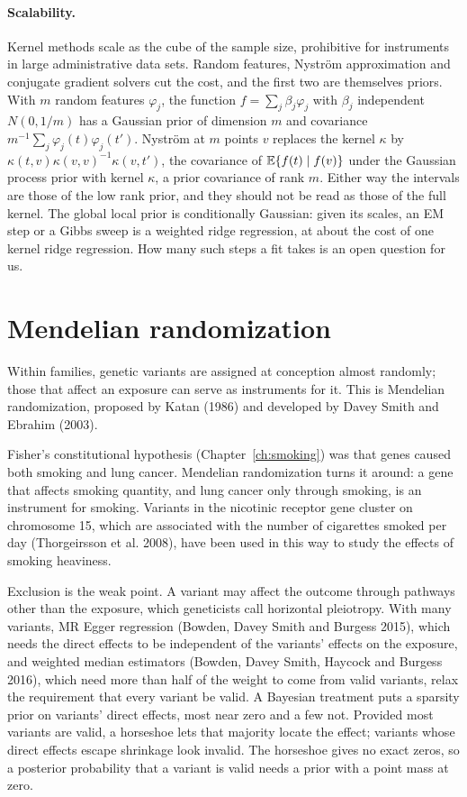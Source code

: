 \paragraph{Scalability.} Kernel methods scale as the cube of the sample size, prohibitive for instruments in large administrative data sets. Random features, Nystr\"om approximation and conjugate gradient solvers cut the cost, and the first two are themselves priors. With $m$ random features $\varphi_j$, the function $f = \sum_j \beta_j\varphi_j$ with $\beta_j$ independent $N(0, 1/m)$ has a Gaussian prior of dimension $m$ and covariance $m^{-1}\sum_j \varphi_j(t)\varphi_j(t')$. Nystr\"om at $m$ points $v$ replaces the kernel $\kappa$ by $\kappa(t, v)\kappa(v, v)^{-1}\kappa(v, t')$, the covariance of $\mathbb{E}\{f(t) \mid f(v)\}$ under the Gaussian process prior with kernel $\kappa$, a prior covariance of rank $m$. Either way the intervals are those of the low rank prior, and they should not be read as those of the full kernel. The global local prior is conditionally Gaussian: given its scales, an EM step or a Gibbs sweep is a weighted ridge regression, at about the cost of one kernel ridge regression. How many such steps a fit takes is an open question for us.

\section{Mendelian randomization}\label{iv:sec:mr}

Within families, genetic variants are assigned at conception almost randomly; those that affect an exposure can serve as instruments for it. This is Mendelian randomization, proposed by Katan (1986) and developed by Davey Smith and Ebrahim (2003).

Fisher's constitutional hypothesis (Chapter~\ref{ch:smoking}) was that genes caused both smoking and lung cancer. Mendelian randomization turns it around: a gene that affects smoking quantity, and lung cancer only through smoking, is an instrument for smoking. Variants in the nicotinic receptor gene cluster on chromosome 15, which are associated with the number of cigarettes smoked per day (Thorgeirsson et al. 2008), have been used in this way to study the effects of smoking heaviness.

Exclusion is the weak point. A variant may affect the outcome through pathways other than the exposure, which geneticists call horizontal pleiotropy. With many variants, MR Egger regression (Bowden, Davey Smith and Burgess 2015), which needs the direct effects to be independent of the variants' effects on the exposure, and weighted median estimators (Bowden, Davey Smith, Haycock and Burgess 2016), which need more than half of the weight to come from valid variants, relax the requirement that every variant be valid. A Bayesian treatment puts a sparsity prior on variants' direct effects, most near zero and a few not. Provided most variants are valid, a horseshoe lets that majority locate the effect; variants whose direct effects escape shrinkage look invalid. The horseshoe gives no exact zeros, so a posterior probability that a variant is valid needs a prior with a point mass at zero.

